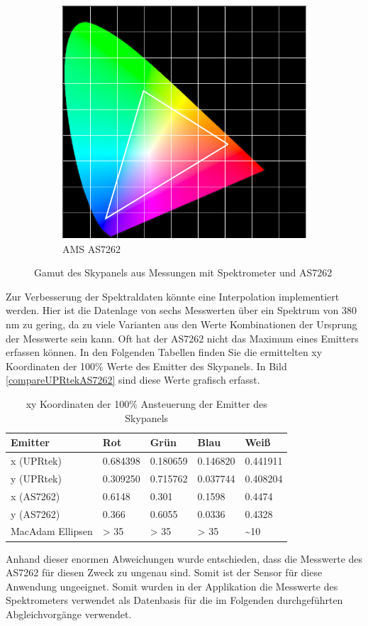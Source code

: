\documentclass[11pt]{scrartcl}
\begin{document}
\begin{figure}[H]
\begin{subfigure}[b]{.49\textwidth}
        \includegraphics[width=\textwidth]{images/app_skypanel_gamut_as7262.png}
        \caption{AMS AS7262}
    \end{subfigure}
    \caption{Gamut des Skypanels aus Messungen mit Spektrometer und AS7262}
\end{figure}
\noindent
Zur Verbesserung der Spektraldaten könnte eine Interpolation implementiert werden. Hier ist die Datenlage von sechs Messwerten über ein Spektrum von 380 nm
zu gering, da zu viele Varianten aus den Werte Kombinationen der Ursprung der Messwerte sein kann. Oft hat der AS7262 nicht das Maximum eines Emitters erfassen
können.
In den Folgenden Tabellen finden Sie die ermittelten xy Koordinaten der 100\% Werte des Emitter des Skypanels. In Bild \ref{compareUPRtekAS7262} sind diese
Werte grafisch erfasst.
\begin{table}[H]
    \begin{tabularx}{\textwidth}{|l|X|X|X|X|}
        \hline Emitter   & Rot      & Grün     & Blau     & Weiß\\\hline
        x (UPRtek)       & 0.684398 & 0.180659 & 0.146820 & 0.441911\\\hline
        y (UPRtek)       & 0.309250 & 0.715762 & 0.037744 & 0.408204\\\hline
        x (AS7262)       & 0.6148   & 0.301    & 0.1598   & 0.4474\\\hline
        y (AS7262)       & 0.366    & 0.6055   & 0.0336   & 0.4328\\\hline
        MacAdam Ellipsen & > 35     & > 35     & > 35     & \textasciitilde 10\\\hline
    \end{tabularx}
    \caption{xy Koordinaten der 100\% Ansteuerung der Emitter des Skypanels}
\end{table}
\noindent
Anhand dieser enormen Abweichungen wurde entschieden, dass die Messwerte des AS7262 für diesen Zweck zu ungenau sind. Somit ist der Sensor für diese Anwendung
ungeeignet. Somit wurden in der Applikation die Messwerte des Spektrometers verwendet als Datenbasis für die im Folgenden durchgeführten Abgleichvorgänge
verwendet.
\end{document}
